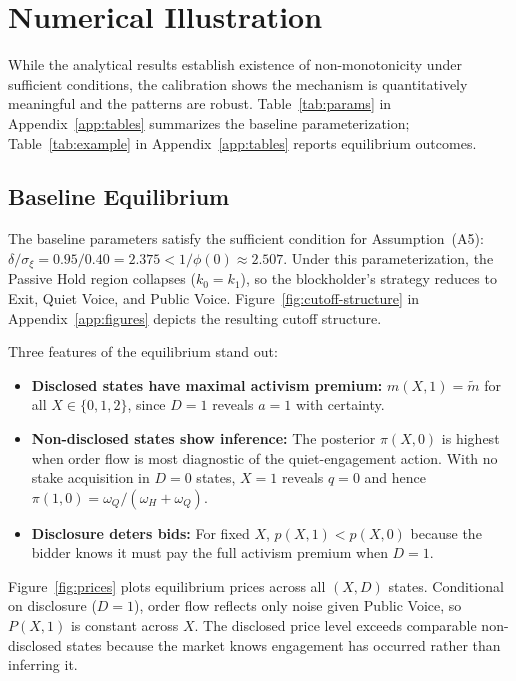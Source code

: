 \section{Numerical Illustration}
\label{sec:numerical}

While the analytical results establish existence of non-monotonicity under sufficient conditions, the calibration shows the mechanism is quantitatively meaningful and the patterns are robust. Table~\ref{tab:params} in Appendix~\ref{app:tables} summarizes the baseline parameterization; Table~\ref{tab:example} in Appendix~\ref{app:tables} reports equilibrium outcomes.

\subsection{Baseline Equilibrium}

The baseline parameters satisfy the sufficient condition for Assumption~\textup{(A5)}: $\delta/\sigma_\xi = 0.95/0.40 = 2.375 < 1/\phi(0) \approx 2.507$. Under this parameterization, the Passive Hold region collapses ($k_0=k_1$), so the blockholder's strategy reduces to Exit, Quiet Voice, and Public Voice. Figure~\ref{fig:cutoff-structure} in Appendix~\ref{app:figures} depicts the resulting cutoff structure.

Three features of the equilibrium stand out:
\begin{itemize}[leftmargin=2em,itemsep=2pt]
\item \textbf{Disclosed states have maximal activism premium:} $m(X,1) = \tilde{m}$ for all $X \in \{0,1,2\}$, since $D=1$ reveals $a=1$ with certainty.
\item \textbf{Non-disclosed states show inference:} The posterior $\pi(X,0)$ is highest when order flow is most diagnostic of the quiet-engagement action. With no stake acquisition in $D=0$ states, $X=1$ reveals $q=0$ and hence $\pi(1,0)=\omega_Q/(\omega_H+\omega_Q)$.
\item \textbf{Disclosure deters bids:} For fixed $X$, $p(X,1) < p(X,0)$ because the bidder knows it must pay the full activism premium when $D=1$.
\end{itemize}

Figure~\ref{fig:prices} plots equilibrium prices across all $(X,D)$ states. Conditional on disclosure ($D=1$), order flow reflects only noise given Public Voice, so $P(X,1)$ is constant across $X$. The disclosed price level exceeds comparable non-disclosed states because the market knows engagement has occurred rather than inferring it.

